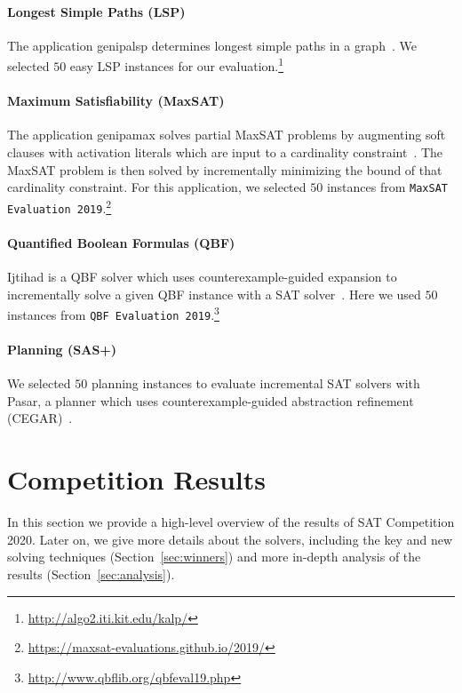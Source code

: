 \documentclass{elsarticle}
\begin{document}
\paragraph{Longest Simple Paths (LSP)}

The application \textsf{genipalsp} determines longest simple paths in a graph~\cite{Balyo:2019:LSP}. 
We selected $50$ easy LSP instances for our evaluation.\footnote{\url{http://algo2.iti.kit.edu/kalp/}} 

\paragraph{Maximum Satisfiability (MaxSAT)}

The application \textsf{genipamax} solves partial MaxSAT problems by augmenting soft clauses with activation literals which are input to a cardinality constraint~\cite{Philipp:2015:PBLib}. 
The MaxSAT problem is then solved by incrementally minimizing the bound of that cardinality constraint. 
For this application, we selected $50$ instances from \texttt{MaxSAT Evaluation 2019}.\footnote{\url{https://maxsat-evaluations.github.io/2019/}}

\paragraph{Quantified Boolean Formulas (QBF)}
\textsf{Ijtihad} is a QBF solver which uses counter\-example-guided expansion to incrementally solve a given QBF instance with a SAT solver~\cite{Bloem:2018:QBFSAT}. 
Here we used $50$ instances from \texttt{QBF Evaluation 2019}.\footnote{\url{http://www.qbflib.org/qbfeval19.php}}

\paragraph{Planning (SAS+)}
We selected $50$ planning instances to evaluate incremental SAT solvers with \textsf{Pasar}, a planner which uses counter\-example-guided abstraction refinement (CEGAR)~\cite{Froleyks:2019:Pasar}. 


\section{Competition Results}
\label{sec:results}

In this section we provide a high-level overview of the results of SAT Competition 2020.
Later on, we give more details about the solvers, including the key and new solving techniques
(Section~\ref{sec:winners}) and more in-depth analysis of the results (Section~\ref{sec:analysis}).
\end{document}
